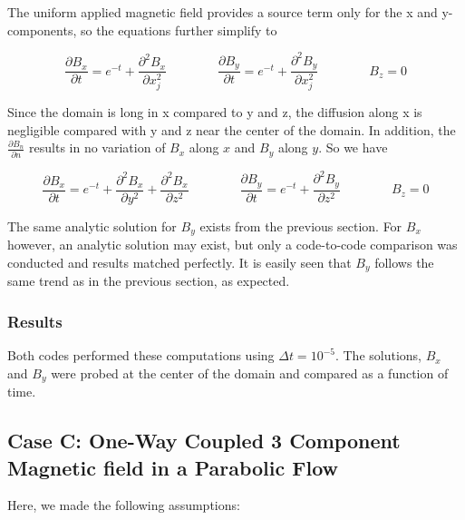 \documentclass[11pt]{article}
\newcommand{\figS}{22.1em}
\newcommand{\figH}{\figS}
\newcommand{\figW}{\figS}
\begin{document}
The uniform applied magnetic field provides a source term only for the x and y-components, so the equations further simplify to

\begin{equation}
	\frac{\partial B_x}{\partial t} 
	=
	e^{-t}
	+
	\frac{\partial^2 B_x}{\partial x_j^2} 
	\qquad \qquad
	\frac{\partial B_y}{\partial t} 
	=
	e^{-t}
	+
	\frac{\partial^2 B_y}{\partial x_j^2} 
	\qquad \qquad
	B_z = 0
\end{equation}

Since the domain is long in x compared to y and z, the diffusion along x is negligible compared with y and z near the center of the domain. In addition, the $\frac{\partial B_n}{\partial n}$ results in no variation of $B_x$ along $x$ and $B_y$ along $y$. So we have

\begin{equation}
	\frac{\partial B_x}{\partial t} 
	=
	e^{-t}
	+
	\frac{\partial^2 B_x}{\partial y^2} 
	+
	\frac{\partial^2 B_x}{\partial z^2} 
	\qquad \qquad
	\frac{\partial B_y}{\partial t} 
	=
	e^{-t}
	+
	\frac{\partial^2 B_y}{\partial z^2} 
	\qquad \qquad
	B_z = 0
\end{equation}

The same analytic solution for $B_y$ exists from the previous section. For $B_x$ however, an analytic solution may exist, but only a code-to-code comparison was conducted and results matched perfectly. It is easily seen that $B_y$ follows the same trend as in the previous section, as expected.

\subsubsection{Results}
Both codes performed these computations using $\Delta t = 10^{-5}$. The solutions, $B_x$ and $B_y$ were probed at the center of the domain and compared as a function of time.

\begin{figure}[H]
 \centering
   \caption[Optional ]{}
\end{figure}


\subsection{Case C: One-Way Coupled 3 Component Magnetic field in a Parabolic Flow}

Here, we made the following assumptions:
\end{document}
